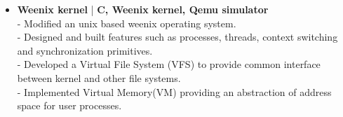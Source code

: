 \begin{itemize}
  \item \textbf{Weenix kernel} | \textbf{C, Weenix kernel, Qemu simulator}\\
 - Modified an unix based weenix operating system.\\
 - Designed and built features such as processes, threads, context switching and synchronization primitives.\\
 - Developed a Virtual File System (VFS) to provide common interface between kernel and other file systems. \\
 - Implemented Virtual Memory(VM) providing an abstraction of address space for user processes.

\end{itemize}
\vspace{5pt}
